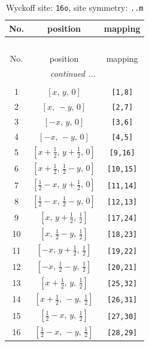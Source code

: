 \documentclass[fleqn,8pt]{jsarticle}
\begin{document}
\renewcommand{\arraystretch}{1.2}
\begin{longtable}{ccc}
\caption{Wyckoff site: {\tt 16o}, site symmetry: {\tt ..m}}
 \\
 \hline \hline
No. & position & mapping \\ \hline \endfirsthead

\multicolumn{2}{l}{\tablename\ \thetable{}} \\
 \hline \hline
No. & position & mapping \\ \hline \endhead

 \hline \hline
\multicolumn{2}{r}{\footnotesize\it continued ...} \\ \endfoot

 \hline \hline
\multicolumn{2}{r}{} \\ \endlastfoot

1 & $\left[ x,\, y,\, 0 \right]$ & {\tt [1,8]} \\ \hline
2 & $\left[ x,\, - y,\, 0 \right]$ & {\tt [2,7]} \\ \hline
3 & $\left[ - x,\, y,\, 0 \right]$ & {\tt [3,6]} \\ \hline
4 & $\left[ - x,\, - y,\, 0 \right]$ & {\tt [4,5]} \\ \hline
5 & $\left[ x + \frac{1}{2},\, y + \frac{1}{2},\, 0 \right]$ & {\tt [9,16]} \\ \hline
6 & $\left[ x + \frac{1}{2},\, \frac{1}{2} - y,\, 0 \right]$ & {\tt [10,15]} \\ \hline
7 & $\left[ \frac{1}{2} - x,\, y + \frac{1}{2},\, 0 \right]$ & {\tt [11,14]} \\ \hline
8 & $\left[ \frac{1}{2} - x,\, \frac{1}{2} - y,\, 0 \right]$ & {\tt [12,13]} \\ \hline
9 & $\left[ x,\, y + \frac{1}{2},\, \frac{1}{2} \right]$ & {\tt [17,24]} \\ \hline
10 & $\left[ x,\, \frac{1}{2} - y,\, \frac{1}{2} \right]$ & {\tt [18,23]} \\ \hline
11 & $\left[ - x,\, y + \frac{1}{2},\, \frac{1}{2} \right]$ & {\tt [19,22]} \\ \hline
12 & $\left[ - x,\, \frac{1}{2} - y,\, \frac{1}{2} \right]$ & {\tt [20,21]} \\ \hline
13 & $\left[ x + \frac{1}{2},\, y,\, \frac{1}{2} \right]$ & {\tt [25,32]} \\ \hline
14 & $\left[ x + \frac{1}{2},\, - y,\, \frac{1}{2} \right]$ & {\tt [26,31]} \\ \hline
15 & $\left[ \frac{1}{2} - x,\, y,\, \frac{1}{2} \right]$ & {\tt [27,30]} \\ \hline
16 & $\left[ \frac{1}{2} - x,\, - y,\, \frac{1}{2} \right]$ & {\tt [28,29]} \\
\end{longtable}
\end{document}
